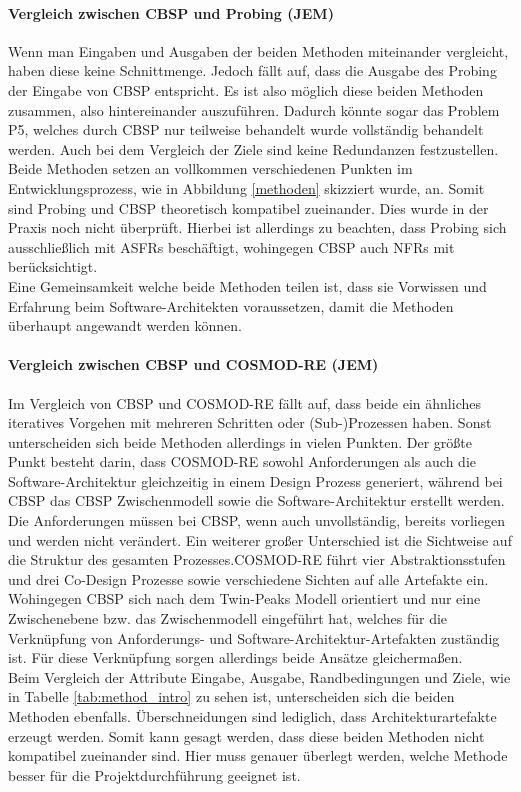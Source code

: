 \paragraph{Vergleich zwischen CBSP und Probing (JEM)}
Wenn man Eingaben und Ausgaben der beiden Methoden miteinander vergleicht, haben diese keine Schnittmenge. Jedoch f\"allt auf, dass die Ausgabe des Probing der Eingabe von CBSP entspricht. Es ist also m\"oglich diese beiden Methoden zusammen, also hintereinander auszuf\"uhren. Dadurch k\"onnte sogar das Problem P5, welches durch CBSP nur teilweise behandelt wurde vollst\"andig behandelt werden. Auch bei dem Vergleich der Ziele sind keine Redundanzen festzustellen. Beide Methoden setzen an vollkommen verschiedenen Punkten im Entwicklungsprozess, wie in Abbildung \ref{methoden} skizziert wurde, an. Somit sind Probing und CBSP theoretisch kompatibel zueinander. Dies wurde in der Praxis noch nicht \"uberpr\"uft. Hierbei ist allerdings zu beachten, dass Probing sich ausschlie\ss{}lich mit ASFRs besch\"aftigt, wohingegen CBSP auch NFRs mit ber\"ucksichtigt. \\ 

Eine Gemeinsamkeit welche beide Methoden teilen ist, dass sie Vorwissen und Erfahrung beim Software-Architekten voraussetzen, damit die Methoden \"uberhaupt angewandt werden k\"onnen. \\

\paragraph{Vergleich zwischen CBSP und COSMOD-RE (JEM)}
Im Vergleich von CBSP und COSMOD-RE f\"allt auf, dass beide ein \"ahnliches iteratives Vorgehen mit mehreren Schritten oder (Sub-)Prozessen haben. Sonst unterscheiden sich beide Methoden allerdings in vielen Punkten. Der gr\"o\ss{}te Punkt besteht darin, dass COSMOD-RE sowohl Anforderungen als auch die Software-Architektur gleichzeitig in einem Design Prozess generiert, w\"ahrend bei CBSP das CBSP Zwischenmodell sowie die Software-Architektur erstellt werden. Die Anforderungen m\"ussen bei CBSP, wenn auch unvollst\"andig, bereits vorliegen und werden nicht ver\"andert. Ein weiterer gro\ss{}er Unterschied ist die Sichtweise auf die Struktur des gesamten Prozesses.COSMOD-RE f\"uhrt vier Abstraktionsstufen und drei Co-Design Prozesse sowie verschiedene Sichten auf alle Artefakte ein. Wohingegen CBSP sich nach dem Twin-Peaks Modell orientiert und nur eine Zwischenebene bzw. das Zwischenmodell eingef\"uhrt hat, welches f\"ur die Verkn\"upfung von Anforderungs- und Software-Architektur-Artefakten zust\"andig ist. F\"ur diese Verkn\"upfung sorgen allerdings beide Ans\"atze gleicherma\ss{}en. \\
Beim Vergleich der Attribute Eingabe, Ausgabe, Randbedingungen und Ziele, wie in Tabelle \ref{tab:method_intro} zu sehen ist, unterscheiden sich die beiden Methoden ebenfalls. \"Uberschneidungen sind lediglich, dass Architekturartefakte erzeugt werden. Somit kann gesagt werden, dass diese beiden Methoden nicht kompatibel zueinander sind. Hier muss genauer \"uberlegt werden, welche Methode besser f\"ur die Projektdurchf\"uhrung geeignet ist. \\

